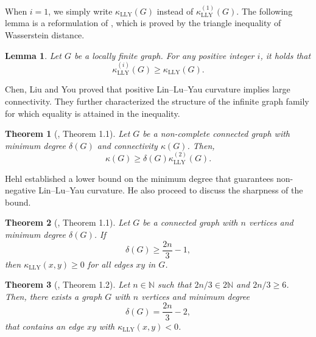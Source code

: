\documentclass[11pt,bezier]{article}
\newtheorem{theorem}{Theorem}[section]
\newtheorem{lemma}{Lemma}[section]
\theoremstyle{definition}
\theoremstyle{definition}
\theoremstyle{nonumber}
\begin{document}
When $i = 1$, we simply write $\kappa_{\mathrm{LLY}}(G)$ instead of $\kappa_{\mathrm{LLY}}^{(1)}(G)$. The following lemma is a reformulation of \cite[Lemma 2.3]{LLY}, which is proved by the triangle inequality of Wasserstein distance.

\begin{lemma}\label{triangle inequality}
Let $G$ be a locally finite graph. For any positive integer $i$, it holds that
$$
\kappa_{\mathrm{LLY}}^{(i)}(G) \geq \kappa_{\mathrm{LLY}}(G).
$$
\end{lemma}

Chen, Liu and You proved that positive Lin--Lu--Yau curvature implies large connectivity. 
They further characterized the structure of the infinite graph family for which equality is attained in the inequality.

\begin{theorem}[\cite{Liu}, Theorem 1.1]\label{Liu}
Let $G$ be a non-complete connected graph with minimum degree $\delta(G)$ and connectivity $\kappa(G)$. Then,
$$
\kappa(G) \geq \delta(G)  \kappa_{\mathrm{LLY}}^{(2)}(G).
$$
\end{theorem}

Hehl established a lower bound on the minimum degree that guarantees non-negative Lin--Lu--Yau curvature. He also proceed to discuss the sharpness of the bound.

\begin{theorem}[\cite{Hehlmin}, Theorem 1.1]\label{Hehlmin}
Let $G$ be a connected graph with $n$ vertices and minimum degree $\delta(G)$. If$$\delta(G)\geq \frac{2n}{3}-1,$$ then $\kappa_{\mathrm{LLY}}(x,y)\geq0$ for all edges $xy$ in $G$.
\end{theorem}

\begin{theorem}[\cite{Hehlmin}, Theorem 1.2]\label{Hehlmin sharpness}
Let $n \in \mathbb{N}$ such that $2n/3 \in 2\mathbb{N}$ and $2n/3 \geq 6$. Then, there exists a graph $G$ with $n$ vertices and minimum degree $$\delta(G) = \frac{2n}{3} - 2,$$ that contains an edge $xy$ with $\kappa_{\mathrm{LLY}}(x, y) < 0$.
\end{theorem}


\end{document}
